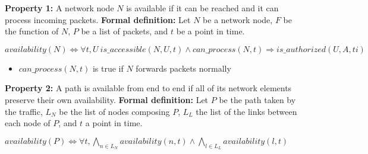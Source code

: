 \textbf{Property 1:} A network node $N$ is available if it can be reached and it can process incoming packets.
\newline
\textbf{Formal definition:} Let $N$ be a network node, $F$ be the function of $N$, $P$ be a list of packets, and $t$ be a point in time.

\begin{myformula}
$availability(N) \Leftrightarrow \forall t,U~ is\_accessible(N,U,t) \wedge can\_process(N,t) \Rightarrow is\_authorized(U,A,ti)$
\end{myformula}

\begin{itemize}
\item $can\_process(N,t)$ is true if $N$ forwards packets normally
\end{itemize} 






\textbf{Property 2:} A path is available from end to end if all of its network elements preserve their own availability.
\newline \textbf{Formal definition:} Let $P$ be the path taken by the traffic, $L_N$ be the list of nodes composing $P$, $L_L$ the list of the links between each node of $P$, and $t$ a point in time. 

\begin{myformula}
$availability(P)\Leftrightarrow \forall t, \bigwedge\limits_{n \in L_N}availability(n,t) \wedge \bigwedge\limits_{l \in L_L}availability(l,t)$
\end{myformula}


